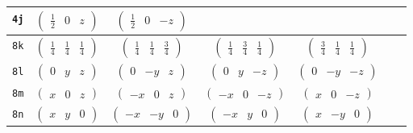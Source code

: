 \documentclass[fleqn,9pt,landscape]{jsarticle}
\begin{document}
\begin{center}
\begin{longtable}{ccccccc}
{\tt 4j} & $ \begin{pmatrix} \frac{1}{2} & 0 & z \end{pmatrix} $ & $ \begin{pmatrix} \frac{1}{2} & 0 & - z \end{pmatrix} $ & $  $ & $  $ & $  $ & $  $ \\ \hline
{\tt 8k} & $ \begin{pmatrix} \frac{1}{4} & \frac{1}{4} & \frac{1}{4} \end{pmatrix} $ & $ \begin{pmatrix} \frac{1}{4} & \frac{1}{4} & \frac{3}{4} \end{pmatrix} $ & $ \begin{pmatrix} \frac{1}{4} & \frac{3}{4} & \frac{1}{4} \end{pmatrix} $ & $ \begin{pmatrix} \frac{3}{4} & \frac{1}{4} & \frac{1}{4} \end{pmatrix} $ & $  $ & $  $ \\ \hline
{\tt 8l} & $ \begin{pmatrix} 0 & y & z \end{pmatrix} $ & $ \begin{pmatrix} 0 & - y & z \end{pmatrix} $ & $ \begin{pmatrix} 0 & y & - z \end{pmatrix} $ & $ \begin{pmatrix} 0 & - y & - z \end{pmatrix} $ & $  $ & $  $ \\ \hline
{\tt 8m} & $ \begin{pmatrix} x & 0 & z \end{pmatrix} $ & $ \begin{pmatrix} - x & 0 & z \end{pmatrix} $ & $ \begin{pmatrix} - x & 0 & - z \end{pmatrix} $ & $ \begin{pmatrix} x & 0 & - z \end{pmatrix} $ & $  $ & $  $ \\ \hline
{\tt 8n} & $ \begin{pmatrix} x & y & 0 \end{pmatrix} $ & $ \begin{pmatrix} - x & - y & 0 \end{pmatrix} $ & $ \begin{pmatrix} - x & y & 0 \end{pmatrix} $ & $ \begin{pmatrix} x & - y & 0 \end{pmatrix} $ & $  $ & $  $ \\ \hline

\end{longtable}
\end{center}
\end{document}
